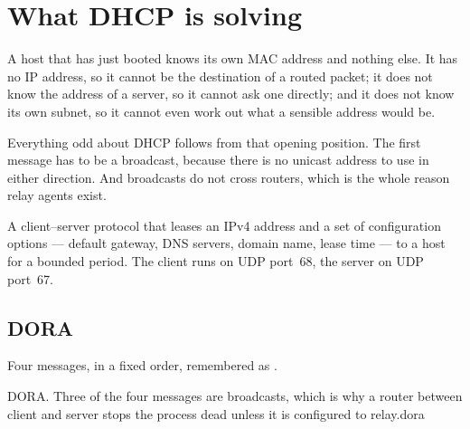 \section{What DHCP is solving}

A host that has just booted knows its own MAC address and nothing else. It has no
IP address, so it cannot be the destination of a routed packet; it does not know
the address of a server, so it cannot ask one directly; and it does not know its
own subnet, so it cannot even work out what a sensible address would be.

Everything odd about DHCP follows from that opening position. The first message
has to be a broadcast, because there is no unicast address to use in either
direction. And broadcasts do not cross routers, which is the whole reason relay
agents exist.

\begin{definitionbox}[DHCPv4]
A client--server protocol that leases an IPv4 address and a set of configuration
options --- default gateway, DNS servers, domain name, lease time --- to a host
for a bounded period. The client runs on UDP port~68, the server on UDP port~67.
\end{definitionbox}

\subsection{DORA}

Four messages, in a fixed order, remembered as .

%
{DORA. Three of the four messages are broadcasts, which is why a router between
client and server stops the process dead unless it is configured to relay.}{dora}

